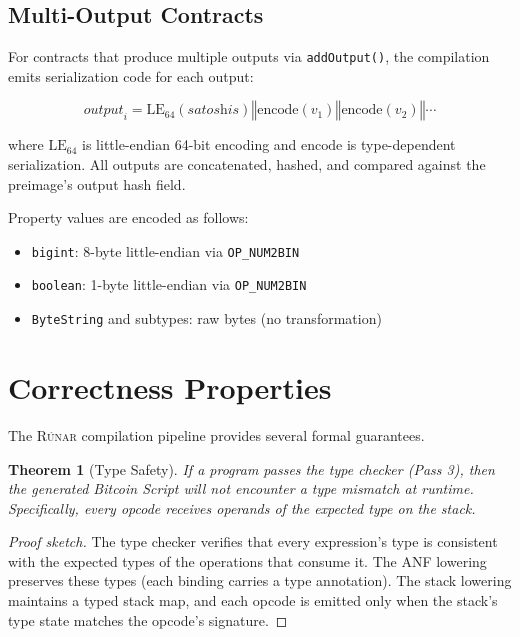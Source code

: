 \documentclass[11pt,a4paper]{article}
\newtheorem{theorem}{Theorem}[section]
\newcommand{\op}[1]{\texttt{OP\_#1}}
\newcommand{\runar}{\textsc{Rúnar}}
\newcommand{\bs}{\texttt{ByteString}}
\newcommand{\bigintty}{\texttt{bigint}}
\newcommand{\boolty}{\texttt{boolean}}
\begin{document}
\subsection{Multi-Output Contracts}
\label{sec:multi-output}

For contracts that produce multiple outputs via \texttt{addOutput()}, the
compilation emits serialization code for each output:

\[
\textit{output}_i = \text{LE}_{64}(\textit{satoshis}) \mathbin\Vert
  \text{encode}(v_1) \mathbin\Vert \text{encode}(v_2) \mathbin\Vert \cdots
\]

where $\text{LE}_{64}$ is little-endian 64-bit encoding and
$\text{encode}$ is type-dependent serialization. All outputs are
concatenated, hashed, and compared against the preimage's output hash field.

Property values are encoded as follows:
\begin{itemize}[nosep]
  \item \bigintty{}: 8-byte little-endian via \op{NUM2BIN}
  \item \boolty{}: 1-byte little-endian via \op{NUM2BIN}
  \item \bs{} and subtypes: raw bytes (no transformation)
\end{itemize}

\section{Correctness Properties}
\label{sec:correctness}

The \runar{} compilation pipeline provides several formal guarantees.

\begin{theorem}[Type Safety]
\label{thm:type-safety}
If a program passes the type checker (Pass 3), then the generated Bitcoin
Script will not encounter a type mismatch at runtime. Specifically, every
opcode receives operands of the expected type on the stack.
\end{theorem}

\begin{proof}[Proof sketch]
The type checker verifies that every expression's type is consistent with
the expected types of the operations that consume it. The ANF lowering
preserves these types (each binding carries a type annotation). The stack
lowering maintains a typed stack map, and each opcode is emitted only when
the stack's type state matches the opcode's signature.
\end{proof}
\end{document}
